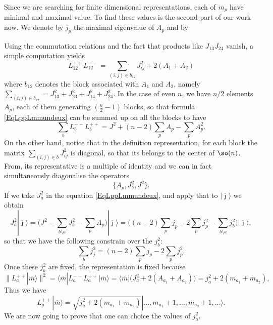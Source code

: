 Since we are searching for finite dimensional representations, each of $m_p$ have minimal and maximal value. To find these values is the second part of our work now. We denote by $j_p$ the maximal eigenvalue of $A_p$ and by 

Using the commutation relations and the fact that products like $J_{13}J_{24}$ vanish, a simple computation yields
\begin{equation}	\label{EqLppLmmundeux}
	L_{12}^{++}L_{12}^{--}=\sum_{(i,j)\in b_{12}} J_{ij}^2+2(A_1+A_2)
\end{equation}
where $b_{12}$ denotes the block associated with $A_1$ and $A_2$, namely $\sum_{(i,j)\in b_{12}}=J_{13}^2+J_{23}^2+J_{14}^2+J_{24}^2$. In the case of even $n$, we have $n/2$ elements $A_p$, each of them generating $(\frac{ n }{ 2 }-1)$ blocks, so that formula \eqref{EqLppLmmundeux} can be summed up on all the blocks to have
\begin{equation}
	\sum_{b}L_b^{--}L_b^{++}=J^2+(n-2)\sum_pA_p-\sum_pA_p^2.
\end{equation}
On the other hand, notice that in the definition representation, for each block the matrix $\sum_{(i,j)\in b}J_{ij}^2$ is diagonal, so that its belongs to the center of $\so(n)$. From, its representative is a multiple of identity and we can in fact simultaneously diagonalise the operators
\begin{equation}
	\{ A_p,J_b^2,J^2 \}.
\end{equation}
If we take $J_a^2$ in the equation \eqref{EqLppLmmundeux}, and apply that to $| \overline{ \jmath } \rangle$ we obtain
\begin{equation}
	J_a^2| \overline{ \jmath } \rangle	=\Big( J^2-\sum_{b\setminus a}J_b^2-\sum_pA_p \Big)| \overline{ \jmath } \rangle
	=\Big( (n-2)\sum_pj_p-2\sum_pj_p^2-\sum_{b\setminus a}j_b^2 \Big)| \overline{ \jmath } \rangle,
\end{equation}
so that we have the following constrain over the $j_b^2$:
\begin{equation}		\label{EqCondCompajsqsumjdeux}
	\sum_bj_j^2=(n-2)\sum_pj_p-2\sum_pj_p^2.
\end{equation}
Once these $j_b^2$ are fixed, the representation is fixed because
\begin{equation}
	\| L_a^{++}| \overline{ m } \rangle \|^2=\langle\overline{ m }| L_a^{--}L_a^{++} | \overline{ m } \rangle=\langle \overline{ m }| \big( J_a^2+2(A_{a_1}+A_{a_2}) \big)=j_a^2+2(m_{a_1}+m_{a_2}),
\end{equation}
Thus we have
\begin{equation}			\label{EqLppketmsqrtjjjldots}
	L_a^{++}| \overline{ m } \rangle=\sqrt{  j_a^2+2(m_{a_1}+m_{a_2})  }| \ldots,m_{a_1}+1,\ldots,m_{a_2}+1,\ldots \rangle.
\end{equation}
We are now going to prove that one can choice the values of $j_a^2$.

